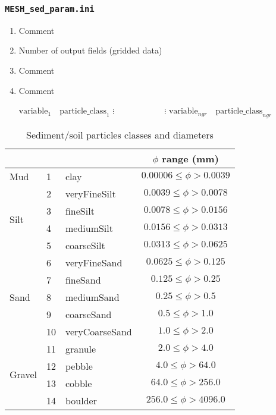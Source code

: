 \documentclass[12pt, letterpaper]{article}
\newcounter{ResumeEnumerate}
\begin{document}
\subsubsection{\texttt{MESH\_sed\_param.ini}}
{\tiny
\begin{enumerate}[start=\numexpr\value{ResumeEnumerate}+1, label=Line \arabic*]\itemsep0em 
\item Comment
\item Number of output fields (gridded data)
\item Comment
\item Comment
\parbox{\textwidth}{
$\text{variable}_1 \quad \text{particle\_class}_1$ \newline
$\vdots \quad\quad\quad\quad\quad\quad \vdots$ \newline
$\text{variable}_{ngr} \quad \text{particle\_class}_{ngr} $
}
\end{enumerate}
}

\begin{table}[ht]
\centering
\caption{Sediment/soil particles classes and diameters \cite{Wentworth1922}}
\label{sedClass}
\begin{tabular}{lllc}
\hline
\multicolumn{3}{c}{\color{red}{particle\_class}}  & $\phi$ range (mm) \\
\hline
Mud & 1 & clay     		& $0.00006 \leq \phi > 0.0039$     \\ \hline
\multirow{4}{*}{Silt} & 2 & veryFineSilt     & $0.0039 \leq \phi > 0.0078$     \\
& 3 & fineSilt			& $0.0078 \leq \phi > 0.0156$     \\
& 4 & mediumSilt		& $0.0156 \leq \phi > 0.0313$     \\
& 5 & coarseSilt		& $0.0313 \leq \phi > 0.0625$     \\ \hline
\multirow{5}{*}{Sand} & 6 & veryFineSand		& $0.0625 \leq \phi > 0.125$     \\
& 7 & fineSand			& $0.125 \leq \phi > 0.25$     \\
& 8 & mediumSand		& $0.25 \leq \phi > 0.5$     \\
& 9 & coarseSand		& $0.5 \leq \phi > 1.0$     \\
& 10 & veryCoarseSand	& $1.0 \leq \phi > 2.0$     \\ \hline
\multirow{4}{*}{Gravel} & 11 &  granule			& $2.0 \leq \phi > 4.0$     \\
& 12 & pebble			& $4.0 \leq \phi > 64.0$     \\
& 13 & cobble			& $64.0 \leq \phi > 256.0$     \\
& 14 & boulder			& $256.0 \leq \phi > 4096.0$  \\
\hline
\end{tabular}
\end{table}
\end{document}
